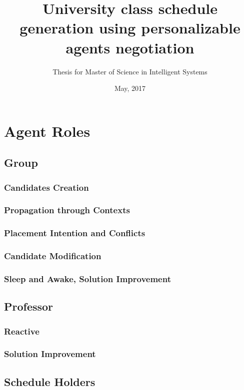 \documentclass{beamer}
\title{University class schedule generation using personalizable agents negotiation}
\subtitle{Thesis for Master of Science in Intelligent Systems}
\institute[ITESM]{Tecnol\'{o}gico de Monterrey}
\date{May, 2017}
\begin{document}
\frame{\titlepage}









\section{Agent Roles}

\subsection{Group}
\subsubsection{Candidates Creation}
\subsubsection{Propagation through Contexts}
\subsubsection{Placement Intention and Conflicts}
\subsubsection{Candidate Modification}
\subsubsection{Sleep and Awake, Solution Improvement}

\subsection{Professor}
\subsubsection{Reactive}
\subsubsection{Solution Improvement}

\subsection{Schedule Holders}
\end{document}
